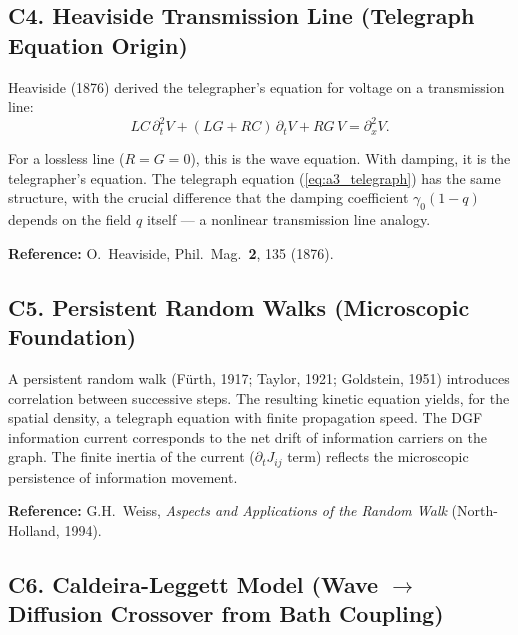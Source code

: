 \documentclass[reprint]{revtex4-2}
\begin{document}
\subsection{C4. Heaviside Transmission Line (Telegraph Equation Origin)}

Heaviside (1876) derived the telegrapher's equation for voltage on a transmission line:
\begin{equation}
LC\,\partial_t^2 V + (LG+RC)\,\partial_t V + RG\,V = \partial_x^2 V.
\end{equation}

For a lossless line ($R=G=0$), this is the wave equation. With damping, it is the telegrapher's equation. The telegraph equation (\ref{eq:a3_telegraph}) has the same structure, with the crucial difference that the damping coefficient $\gamma_0(1-q)$ depends on the field $q$ itself --- a nonlinear transmission line analogy.

\textbf{Reference:} O.\ Heaviside, Phil.\ Mag.\ \textbf{2}, 135 (1876).

\subsection{C5. Persistent Random Walks (Microscopic Foundation)}

A persistent random walk (F\"urth, 1917; Taylor, 1921; Goldstein, 1951) introduces correlation between successive steps. The resulting kinetic equation yields, for the spatial density, a telegraph equation with finite propagation speed. The DGF information current corresponds to the net drift of information carriers on the graph. The finite inertia of the current ($\partial_t J_{ij}$ term) reflects the microscopic persistence of information movement.

\textbf{Reference:} G.H.\ Weiss, \emph{Aspects and Applications of the Random Walk} (North-Holland, 1994).

\subsection{C6. Caldeira-Leggett Model (Wave $\to$ Diffusion Crossover from Bath Coupling)}
\end{document}
